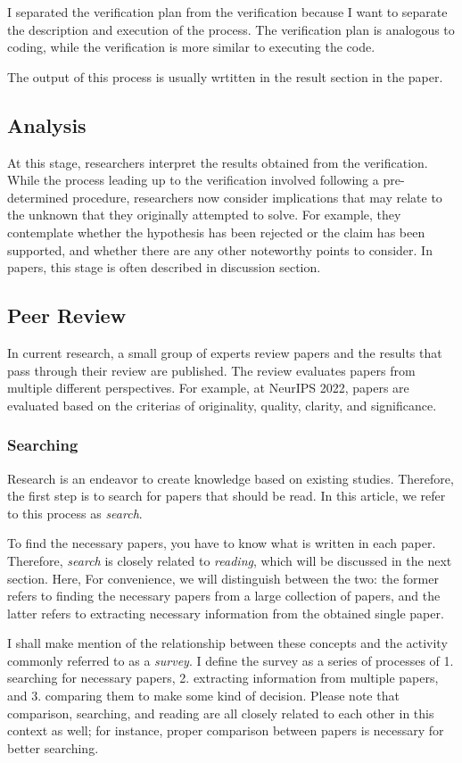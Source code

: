 \documentclass{book}
\begin{document}
I separated the verification plan from the verification because I want to separate the description and execution of the process. The verification plan is analogous to coding, while the verification is more similar to executing the code.

The output of this process is usually wrtitten in the result section in the paper.

\subsection{Analysis}
At this stage, researchers interpret the results obtained from the verification. While the process leading up to the verification involved following a pre-determined procedure, researchers now consider implications that may relate to the unknown that they originally attempted to solve. For example, they contemplate whether the hypothesis has been rejected or the claim has been supported, and whether there are any other noteworthy points to consider. In papers, this stage is often described in discussion section.

\subsection{Peer Review}
In current research, a small group of experts review papers and the results that pass through their review are published. The review evaluates papers from multiple different perspectives. For example, at NeurIPS 2022, papers are evaluated based on the criterias of originality, quality, clarity, and significance.

\subsubsection{Searching}
Research is an endeavor to create knowledge based on existing studies. Therefore, the first step is to search for papers that should be read. In this article, we refer to this process as \textit{search}.

To find the necessary papers, you have to know what is written in each paper. Therefore, \textit{search} is closely related to \textit{reading}, which will be discussed in the next section. Here, For convenience, we will distinguish between the two: the former refers to finding the necessary papers from a large collection of papers, and the latter refers to extracting necessary information from the obtained single paper.

I shall make mention of the relationship between these concepts and the activity commonly referred to as a \textit{survey}. I define the survey as a series of processes of 1. searching for necessary papers, 2. extracting information from multiple papers, and 3. comparing them to make some kind of decision. Please note that comparison, searching, and reading are all closely related to each other in this context as well; for instance, proper comparison between papers is necessary for better searching.
\end{document}
